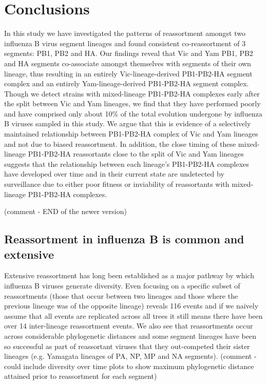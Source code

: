 \documentclass[11pt,oneside,letterpaper]{article}
\begin{document}
\section*{Conclusions}
In this study we have investigated the patterns of reassortment amongst two influenza B virus segment lineages and found consistent co-reassortment of 3 segments: PB1, PB2 and HA.
Our findings reveal that Vic and Yam PB1, PB2 and HA segments co-associate amongst themselves with segments of their own lineage, thus resulting in an entirely Vic-lineage-derived PB1-PB2-HA segment complex and an entirely Yam-lineage-derived PB1-PB2-HA segment complex.
Though we detect strains with mixed-lineage PB1-PB2-HA complexes early after the split between Vic and Yam lineages, we find that they have performed poorly and have comprised only about 10\% of the total evolution undergone by influenza B viruses sampled in this study.
We argue that this is evidence of a selectively maintained relationship between PB1-PB2-HA complex of Vic and Yam lineages and not due to biased reassortment.
In addition, the close timing of these mixed-lineage PB1-PB2-HA reassortants close to the split of Vic and Yam lineages suggests that the relationship between each lineage's PB1-PB2-HA complexes have developed over time and in their current state are undetected by surveillance due to either poor fitness or inviability of reassortants with mixed-lineage PB1-PB2-HA complexes.


(comment - END of the newer version)


\subsection*{Reassortment in influenza B is common and extensive}
Extensive reassortment has long been established as a major pathway by which influenza B viruses generate diversity.
Even focusing on a specific subset of reassortments (those that occur between two lineages and those where the previous lineage was of the opposite lineage) reveals 116 events and if we naively assume that all events are replicated across all trees it still means there have been over 14 inter-lineage reassortment events.
We also see that reassortments occur across considerable phylogenetic distances and some segment lineages have been so successful as part of reassortant viruses that they out-competed their sister lineages (e.g. Yamagata lineages of PA, NP, MP and NA segments). (comment - could include diversity over time plots to show maximum phylogenetic distance attained prior to reassortment for each segment)
\end{document}
